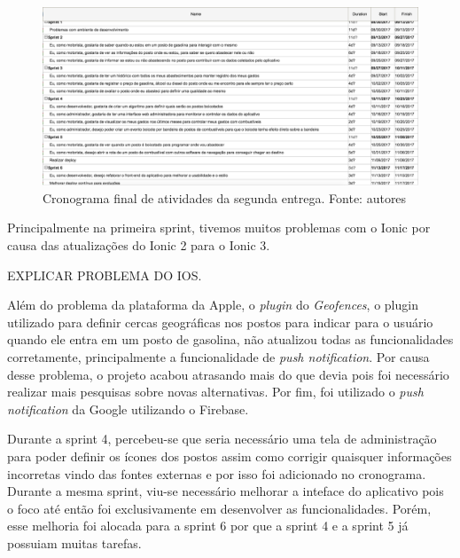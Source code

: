 \begin{figure}[H]
    \centering
    \includegraphics[scale=0.4]{figuras/cronograma_segunda_parte_2.png}
    \caption[Cronograma final de atividades da segunda entrega.]{Cronograma final de atividades da segunda entrega. Fonte: autores}
    \label{img:cronogramafinal}
\end{figure}

Principalmente na primeira sprint, tivemos muitos problemas com o Ionic por causa das atualizações do Ionic 2 para o Ionic 3.

EXPLICAR PROBLEMA DO IOS.

Além do problema da plataforma da Apple, o \textit{plugin} do \textit{Geofences}, o plugin utilizado para definir cercas geográficas nos postos para indicar para o usuário quando ele entra em um posto de gasolina, não atualizou todas as funcionalidades corretamente, principalmente a funcionalidade de \textit{push notification}. Por causa desse problema, o projeto acabou atrasando mais do que devia pois foi necessário realizar mais pesquisas sobre novas alternativas. Por fim, foi utilizado o \textit{push notification} da Google utilizando o Firebase.

Durante a sprint 4, percebeu-se que seria necessário uma tela de administração para poder definir os ícones dos postos assim como corrigir quaisquer informações incorretas vindo das fontes externas e por isso foi adicionado no cronograma. Durante a mesma sprint, viu-se necessário melhorar a inteface do aplicativo pois o foco até então foi exclusivamente em desenvolver as funcionalidades. Porém, esse melhoria foi alocada para a sprint 6 por que a sprint 4 e a sprint 5 já possuiam muitas tarefas.
